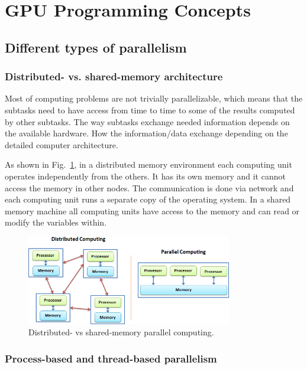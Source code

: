 \section{GPU Programming Concepts}


\subsection{Different types of parallelism}


\subsubsection{Distributed- vs. shared-memory architecture}


\par
Most of computing problems are not trivially parallelizable, which means that the subtasks need to have access from time to time to some of the results computed by other subtasks.
The way subtasks exchange needed information depends on the available hardware.
How the information/data exchange depending on the detailed computer architecture.


\par
As shown in Fig.~\ref{fig:distributed_vs_shared}, in a distributed memory environment each computing unit operates independently from the others.
It has its own memory and it cannot access the memory in other nodes.
The communication is done via network and each computing unit runs a separate copy of the operating system.
In a shared memory machine all computing units have access to the memory and can read or modify the variables within.


\begin{figure}[!h]
\centering\includegraphics[width=0.8\textwidth]{fig_hardware/distributed_vs_shared.png}
\caption{Distributed- vs shared-memory parallel computing.}\label{fig:distributed_vs_shared}
\end{figure}


\subsubsection{Process-based and thread-based parallelism}



